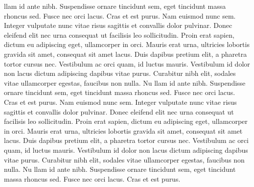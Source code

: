 \documentclass[10pt]{article}
\begin{document}
\begin{multicols*}{2}
llam id ante nibh. Suspendisse ornare tincidunt sem, eget tincidunt massa rhoncus sed. Fusce nec orci lacus. Cras et est purus.
Nam euismod nunc sem. Integer vulputate nunc vitae risus sagittis et convallis dolor pulvinar. Donec eleifend elit nec urna consequat ut facilisis leo sollicitudin. Proin erat sapien, dictum eu adipiscing eget, ullamcorper in orci. Mauris erat urna, ultricies lobortis gravida sit amet, consequat sit amet lacus. Duis dapibus pretium elit, a pharetra tortor cursus nec. Vestibulum ac orci quam, id luctus mauris. Vestibulum id dolor non lacus dictum adipiscing dapibus vitae purus. Curabitur nibh elit, sodales vitae ullamcorper egestas, faucibus non nulla. Nu
llam id ante nibh. Suspendisse ornare tincidunt sem, eget tincidunt massa rhoncus sed. Fusce nec orci lacus. Cras et est purus.
Nam euismod nunc sem. Integer vulputate nunc vitae risus sagittis et convallis dolor pulvinar. Donec eleifend elit nec urna consequat ut facilisis leo sollicitudin. Proin erat sapien, dictum eu adipiscing eget, ullamcorper in orci. Mauris erat urna, ultricies lobortis gravida sit amet, consequat sit amet lacus. Duis dapibus pretium elit, a pharetra tortor cursus nec. Vestibulum ac orci quam, id luctus mauris. Vestibulum id dolor non lacus dictum adipiscing dapibus vitae purus. Curabitur nibh elit, sodales vitae ullamcorper egestas, faucibus non nulla. Nu
llam id ante nibh. Suspendisse ornare tincidunt sem, eget tincidunt massa rhoncus sed. Fusce nec orci lacus. Cras et est purus.


\participation
\biosec


\end{multicols*}
\end{document}

